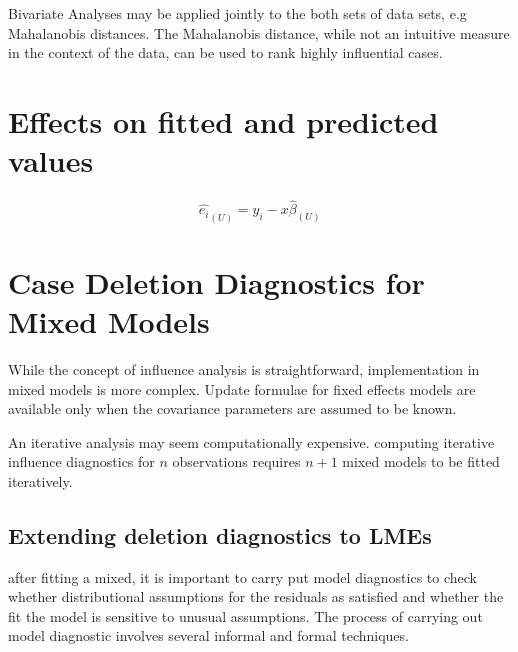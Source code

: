 \documentclass[12pt, a4paper]{report}
\theoremstyle{plain}
\theoremstyle{definition}
\theoremstyle{remark}
\begin{document}
Bivariate Analyses may be applied jointly to the both sets of data sets, e.g Mahalanobis distances. The Mahalanobis distance, while not an intuitive measure in the context of the data, can be used to rank highly influential cases. 


\section{Effects on fitted and predicted values}
\begin{equation}
\hat{e_{i}}_{(U)} = y_{i} - x\hat{\beta}_{(U)}
\end{equation}




	\section{Case Deletion Diagnostics for Mixed Models}
	While the concept of influence analysis is straightforward,
	implementation in mixed models is more complex. Update formulae
	for fixed effects models are available only when the covariance
	parameters are assumed to be known.
	
	
	An iterative analysis may seem computationally expensive.
	computing iterative influence diagnostics for $n$ observations
	requires $n+1$ mixed models to be fitted iteratively.
	
	
	\subsection{Extending deletion diagnostics to LMEs}
	after fitting a mixed, it is important to carry put model
	diagnostics to check whether distributional assumptions for the
	residuals as satisfied and whether the fit the model is sensitive
	to unusual assumptions. The process of carrying out model
	diagnostic involves several informal and formal techniques.
	
	
\end{document}
